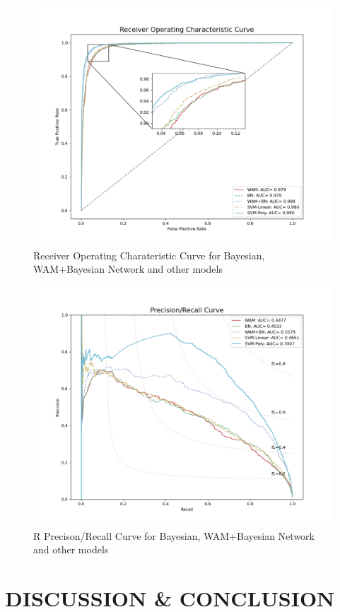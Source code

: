\documentclass{gapd}
\begin{document}
\begin{figure}[htbp]
  \centering
  \includegraphics[width=0.8\linewidth]{assets/ROC_plot.png}
  \caption{Receiver Operating Charateristic Curve  for Bayesian, WAM+Bayesian Network and other models}
  \label{fig:WBROC}
\end{figure}
\begin{figure}[htbp]
  \centering
  \includegraphics[width=0.8\linewidth]{assets/PR_plot.png}
  \caption{R Precison/Recall
  Curve for Bayesian, WAM+Bayesian Network and other models}
  \label{fig:WBPRC}
\end{figure}



\section{DISCUSSION \& CONCLUSION}\label{discussion--conclusion}
\end{document}
